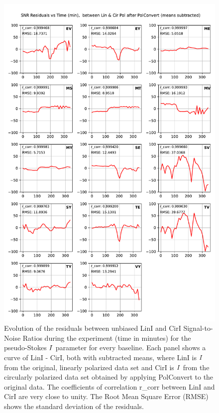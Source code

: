 \documentclass[letterpaper,twoside,12pt]{article}
\begin{document}
\begin{figure}[ht!]
  \begin{center}
  \includegraphics[width=33pc]{SNR_Lin_I_minus_Cir_I.pdf}
  \caption{\small  Evolution of the residuals between unbiased LinI and CirI Signal-to-Noise Ratios during the experiment (time in minutes) for the pseudo-Stokes $\protect I$ parameter for every baseline. Each panel shows a curve of LinI - CirI, both with subtracted means, where LinI is $\protect I$ from the original, linearly polarized data set and CirI is $\protect I$ from the circularly polarized data set obtained by applying PolConvert to the original data. The coefficients of correlation r\_corr between LinI and CirI are very close to unity. The Root Mean Square Error (RMSE) shows the standard deviation of the residuals.}
  \label{snr_lin_minus_cir}
  \end{center}
\end{figure}
\end{document}
